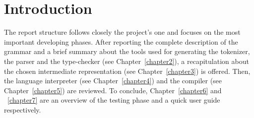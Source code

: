 \chapter{Introduction}

The report structure follows closely the project's one and focuses on the most important developing phases. After reporting the complete description of the \fwap grammar and a brief summary about the tools used for generating the tokenizer, the parser and the type-checker (see Chapter~\ref{chapter2}), a recapitulation about the chosen intermediate representation (see Chapter~\ref{chapter3}) is offered. Then, the language interpreter (see Chapter~\ref{chapter4}) and the \fsharp compiler (see Chapter~\ref{chapter5}) are reviewed. To conclude, Chapter~\ref{chapter6} and ~\ref{chapter7} are an overview of the testing phase and a quick user guide respectively.